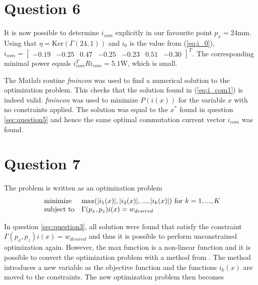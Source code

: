 \documentclass[a4paper,10pt]{article}
\begin{document}
\section{Question 6} \label{sec:question6}
It is now possible to determine $i_{com}$ explicitly in our favourite point $p_x=24 \text{mm}$. Using that $\eta = \text{Ker}(\Gamma(24,1))$ and $i_0$ is the value from (\ref{eq:i_0}), $i_{com} = \begin{bmatrix}
   -0.19 & 
   -0.25 &
    0.47 &
   -0.25 &
   -0.23 &
    0.51 &
   -0.30 
\end{bmatrix}^T$. The corresponding minimal power equals $i_{com}^T R i_{com} = 5.1 \text{W}$, which is small.

The Matlab routine \textit{fmincon} was used to find a numerical solution to the optimization problem. This checks that the solution found in (\ref{eq:i_com1}) is indeed valid. \textit{fmincon} was used to minimize $P(i(x))$ for the variable $x$ with no constraints applied. The solution was equal to the $x^*$ found in question \ref{sec:question5} and hence the same optimal commutation current vector $i_{com}$ was found.


\section{Question 7} \label{sec:question7}
The problem is written as an optimization problem
\begin{equation}
\begin{array}{ll@{}ll}
\text{minimize}  & \text{max}(|i_1(x)|,|i_2(x)|,...,|i_k(x)|) \text{ for } k = 1,...,K\\
\text{subject to}& \Gamma(p_x,p_z)i(x)=w_{desired}
\end{array}
\end{equation}

In question \ref{sec:question3}, all solution were found that satisfy the constraint $\Gamma(p_x,p_z)i(x)=w_{desired}$ and thus it is possible to perform unconstrained optimization again. However, the max function is a non-linear function and it is possible to convert the optimization problem with a method from \cite{minimax}. The method introduces a new variable as the objective function and the functions $i_k(x)$ are moved to the constraints. The new optimization problem then becomes
\end{document}
